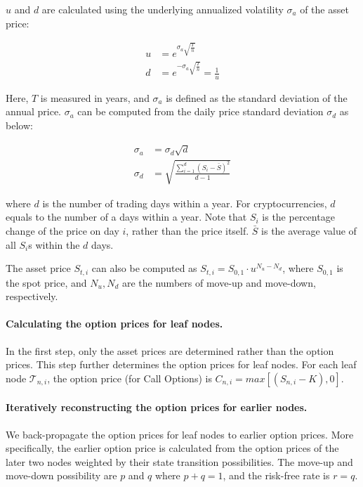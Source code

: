 $u$ and $d$ are calculated using the underlying annualized volatility $\sigma_a$ of the asset price:

\begin{align} 
u &= e^{\sigma_a \sqrt{\frac{T}{n}}}\\
d &= e^{- \sigma_a \sqrt{\frac{T}{n}}} = \frac{1}{u}
\end{align}

Here, $T$ is measured in years, and $\sigma_a$ is defined as the standard deviation of the annual price.
$\sigma_a$ can be computed from the daily price standard deviation $\sigma_d$ as below:

\begin{align} 
\sigma_a &= \sigma_d \sqrt{d}\\
\sigma_d &= \sqrt{\frac{\sum^{d}_{i=1} (S_i - \bar{S})^2}{d-1}}
\end{align}

where $d$ is the number of trading days within a year.
For cryptocurrencies, $d$ equals to the number of a days within a year.
Note that $S_i$ is the percentage change of the price on day $i$, rather than the price itself.
$\bar{S}$ is the average value of all $S_i$s within the $d$ days. 

The asset price $S_{t, i}$ can also be computed as $S_{t, i} = S_{0, 1} \cdot u^{N_u - N_d}$, where $S_{0, 1}$ is the spot price, and $N_u, N_d$ are the numbers of move-up and move-down, respectively.

\paragraph{Calculating the option prices for leaf nodes.}
In the first step, only the asset prices are determined rather than the option prices.
This step further determines the option prices for leaf nodes.
For each leaf node $\mathcal{T}_{n, i}$, the option price (for Call Options) is $C_{n, i} = max[(S_{n, i} - K), 0]$.

\paragraph{Iteratively reconstructing the option prices for earlier nodes.}
We back-propagate the option prices for leaf nodes to earlier option prices.
More specifically, the earlier option price is calculated from the option prices of the later two nodes weighted by their state transition possibilities.
The move-up and move-down possibility are $p$ and $q$ where $p + q = 1$, and the risk-free rate is $r = q$.

